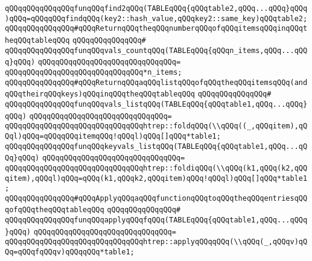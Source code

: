 \verb|qQQqqQQqqQQqqQQqfunqQQqfind2qQQq(TABLEqQQq{qQQqtable2,qQQq...qQQq}qQQq)qQQq=qQQqqQQqfindqQQq(key2::hash_value,qQQqkey2::same_key)qQQqtable2;|\newline
\newline
\verb|qQQqqQQqqQQqqQQq#qQQqReturnqQQqtheqQQqnumberqQQqofqQQqitemsqQQqinqQQqtheqQQqtableqQQq|\newline
\verb|qQQqqQQqqQQqqQQq#|\newline
\verb|qQQqqQQqqQQqqQQqfunqQQqvals_countqQQq(TABLEqQQq{qQQqn_items,qQQq...qQQq}qQQq)|\newline
\verb|qQQqqQQqqQQqqQQqqQQqqQQqqQQqqQQq=|\newline
\verb|qQQqqQQqqQQqqQQqqQQqqQQqqQQqqQQq*n_items;|\newline
\newline
\verb|qQQqqQQqqQQqqQQq#qQQqReturnqQQqaqQQqlistqQQqofqQQqtheqQQqitemsqQQq(andqQQqtheirqQQqkeys)qQQqinqQQqtheqQQqtableqQQq|\newline
\verb|qQQqqQQqqQQqqQQq#|\newline
\verb|qQQqqQQqqQQqqQQqfunqQQqvals_listqQQq(TABLEqQQq{qQQqtable1,qQQq...qQQq}qQQq)|\newline
\verb|qQQqqQQqqQQqqQQqqQQqqQQqqQQqqQQq=|\newline
\verb|qQQqqQQqqQQqqQQqqQQqqQQqqQQqqQQqhtrep::foldqQQq(\\qQQq((_,qQQqitem),qQQql)qQQq=qQQqqQQqitemqQQq!qQQql)qQQq[]qQQq*table1;|\newline
\newline
\verb|qQQqqQQqqQQqqQQqfunqQQqkeyvals_listqQQq(TABLEqQQq{qQQqtable1,qQQq...qQQq}qQQq)|\newline
\verb|qQQqqQQqqQQqqQQqqQQqqQQqqQQqqQQq=|\newline
\verb|qQQqqQQqqQQqqQQqqQQqqQQqqQQqqQQqhtrep::foldiqQQq(\\qQQq(k1,qQQq(k2,qQQqitem),qQQql)qQQq=qQQq(k1,qQQqk2,qQQqitem)qQQq!qQQql)qQQq[]qQQq*table1;|\newline
\newline
\verb|qQQqqQQqqQQqqQQq#qQQqApplyqQQqaqQQqfunctionqQQqtoqQQqtheqQQqentriesqQQqofqQQqtheqQQqtableqQQq|\newline
\verb|qQQqqQQqqQQqqQQq#|\newline
\verb|qQQqqQQqqQQqqQQqfunqQQqapplyqQQqfqQQq(TABLEqQQq{qQQqtable1,qQQq...qQQq}qQQq)|\newline
\verb|qQQqqQQqqQQqqQQqqQQqqQQqqQQqqQQq=|\newline
\verb|qQQqqQQqqQQqqQQqqQQqqQQqqQQqqQQqhtrep::applyqQQqqQQq(\\qQQq(_,qQQqv)qQQq=qQQqfqQQqv)qQQqqQQq*table1;|\newline
